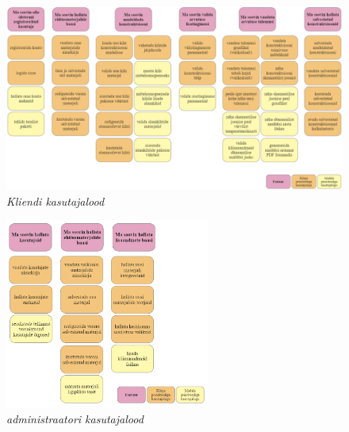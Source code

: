 \begin{figure}[ht]
    \centering
    \includegraphics[width=1\textwidth]{figures/analysis/client_userstories.png}
    \caption[Funktsionaalsed nõuded, kliendi kasutajalood]{\textit{Kliendi kasutajalood}}
    \label{fig:client_userstories}
\end{figure}

\begin{figure}[ht]
    \centering
    \includegraphics[width=0.6\textwidth]{figures/analysis/admin_userstories.png}
    \caption[Funktsionaalsed nõuded, administraatori kasutajalood]{\textit{administraatori kasutajalood}}
    \label{fig:admin_userstories}
\end{figure}